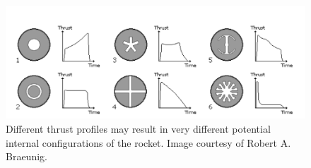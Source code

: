\begin{figure}[h]
    \begin{center}
        \includegraphics[width=0.7\linewidth]{figures/potentialShapes.PNG}
        \caption{Different thrust profiles may result in very different potential internal configurations of the rocket.
        Image courtesy of Robert A. Braeunig.}
        \label{fig:potentialShapes}
    \end{center}
\end{figure}
